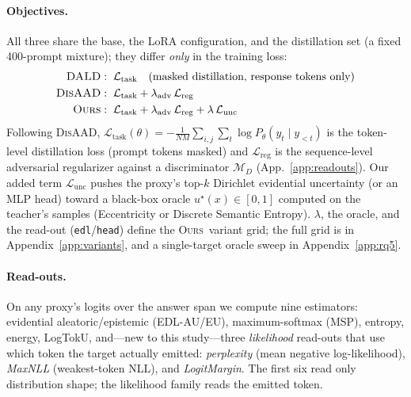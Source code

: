 \documentclass[11pt]{article}
\newcommand{\ours}{\textsc{Ours}}
\newcommand{\dald}{\textsc{DALD}}
\newcommand{\disaad}{\textsc{DisAAD}}
\begin{document}
\paragraph{Objectives.} All three share the base, the LoRA configuration, and the
distillation set (a fixed 400-prompt mixture); they differ \emph{only} in the training
loss:
\[
\begin{aligned}
\dald  &: \; \mathcal{L}_{\text{task}} \quad(\text{masked distillation, response tokens only})\\
\disaad&: \; \mathcal{L}_{\text{task}} + \lambda_{\text{adv}}\,\mathcal{L}_{\text{reg}}\\
\ours  &: \; \mathcal{L}_{\text{task}} + \lambda_{\text{adv}}\,\mathcal{L}_{\text{reg}} + \lambda\,\mathcal{L}_{\text{unc}}
\end{aligned}
\]
Following \disaad, $\mathcal{L}_{\text{task}}(\theta)=-\frac{1}{NM}\sum_{i,j}\sum_t\log
P_\theta(y_t\mid y_{<t})$ is the token-level distillation loss (prompt tokens masked) and
$\mathcal{L}_{\text{reg}}$ is the sequence-level adversarial regularizer against a
discriminator $\mathcal{M}_D$ (App.~\ref{app:readouts}). Our added term
$\mathcal{L}_{\text{unc}}$ pushes the proxy's top-$k$ Dirichlet evidential uncertainty
(or an MLP head) toward a black-box oracle $u^\star(x)\in[0,1]$ computed on the
teacher's samples (Eccentricity or Discrete Semantic Entropy). $\lambda$, the oracle,
and the read-out (\texttt{edl}/\texttt{head}) define the \ours\ variant grid; the full grid is in
Appendix~\ref{app:variants}, and a single-target oracle sweep in Appendix~\ref{app:rq5}.

\paragraph{Read-outs.} On any proxy's logits over the answer span we compute nine
estimators: evidential aleatoric/epistemic (EDL-AU/EU), maximum-softmax (MSP), entropy,
energy, LogTokU, and---new to this study---three \emph{likelihood} read-outs that use
which token the target actually emitted: \emph{perplexity} (mean negative
log-likelihood), \emph{MaxNLL} (weakest-token NLL), and \emph{LogitMargin}. The first
six read only distribution shape; the likelihood family reads the emitted token.
\end{document}
